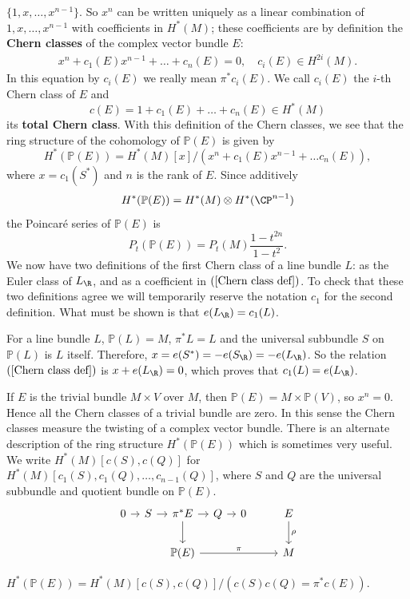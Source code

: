 $\{1,x,\dots,x^{n-1}\}$. So $x^n$ can be written uniquely as a linear combination of $1,x,\dots,x^{n-1}$ with coefficients in $H^*(M)$; these coefficients are by 
definition the \textbf{Chern classes} of the complex vector bundle $E$:
\begin{align}\label{Chern class def}
x^n+c_1(E)x^{n-1}+\dots+c_n(E)=0,\quad c_i(E)\in H^{2i}(M).
\end{align}
In this equation by $c_i(E)$ we really mean $\pi^*c_i(E)$. We call $c_i(E)$ the $i$-th Chern class of $E$ and
\[c(E)=1+c_1(E)+\dots+c_n(E)\in H^*(M)\]
its \textbf{total Chern class}. With this definition of the Chern classes, we see that the ring structure of the cohomology of $\mathbb{P}(E)$ is given by
\[H^*(\mathbb{P}(E))=H^*(M)[x]/(x^n+c_1(E)x^{n-1}+\dots c_n(E)),\]
where $x=c_1(S^*)$ and $n$ is the rank of $E$. Since additively
\[H^*(\mathbb{P}(E))=H^*(M)\otimes H^*(\CP^{n-1})\]
the Poincar\'e series of $\mathbb{P}(E)$ is
\[P_t(\mathbb{P}(E))=P_t(M)\frac{1-t^{2n}}{1-t^2}.\]
We now have two definitions of the first Chern class of a line bundle $L$: as the Euler class of $L_{\R}$, and as a coefficient in $(\ref{Chern class def})$. To check 
that these two definitions agree we will temporarily reserve the notation $c_1$ for the second definition. What must be shown is that $e(L_{\R})=c_1(L)$.\par
For a line bundle $L$, $\mathbb{P}(L)=M$, $\pi^*L=L$ and the universal subbundle $S$ on $\mathbb{P}(L)$ is $L$ itself. Therefore, $x=e(S^*)=-e(S_{\R})=-e(L_{\R})$. So 
the relation $(\ref{Chern class def})$ is $x+e(L_{\R})=0$, which proves that $c_1(L)=e(L_{\R})$.\par
If $E$ is the trivial bundle $M\times V$ over $M$, then $\mathbb{P}(E)=M\times\mathbb{P}(V)$, so $x^n=0$. Hence all the Chern classes of a trivial bundle are zero. In 
this sense the Chern classes measure the twisting of a complex vector bundle.
There is an alternate description of the ring structure $H^*(\mathbb{P}(E))$ which is sometimes very useful. We write $H^*(M)[c(S),c(Q)]$ for $H^*(M)[c_1(S),c_1(Q),\dots,c_{n-1}(Q)]$, 
where $S$ and $Q$ are the universal subbundle and quotient bundle on $\mathbb{P}(E)$.
\[\begin{tikzcd}[column sep=0.8em]
0\ar[r]&S\ar[r]&\pi^*E\ar[d]\ar[r]&Q\ar[r]&0&&&E\ar[d,"\rho"]\\
&&\mathbb{P}(E)\ar[rrrrr,"\pi"]&&&&&M
\end{tikzcd}\]
\begin{proposition}\label{cohomology P(E) description}
$H^*(\mathbb{P}(E))=H^*(M)[c(S),c(Q)]/(c(S)c(Q)=\pi^*c(E))$.
\end{proposition}
